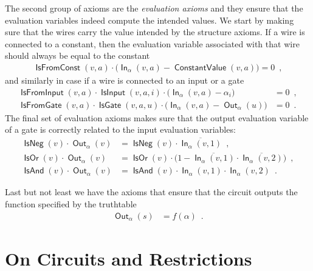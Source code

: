 \documentclass[10pt,a4paper]{article}
\theoremstyle{plain}
\theoremstyle{remark}
\theoremstyle{definition}
\newcommand{\eqcomma}{\enspace ,}
\newcommand{\eqperiod}{\enspace .}
\newcommand{\vars}[1]{\mathsf{#1}}
\DeclareMathOperator{\outwire}{\vars{Out}}
\DeclareMathOperator{\inwire}{\vars{In}}
\DeclareMathOperator{\isneg}{\vars{IsNeg}}
\DeclareMathOperator{\isand}{\vars{IsAnd}}
\DeclareMathOperator{\isor}{\vars{IsOr}}
\DeclareMathOperator{\isfromconst}{\vars{IsFromConst}}
\DeclareMathOperator{\isfromvar}{\vars{IsFromInput}}
\DeclareMathOperator{\isfromgate}{\vars{IsFromGate}}
\DeclareMathOperator{\constval}{\vars{ConstantValue}}
\DeclareMathOperator{\isvar}{\vars{IsInput}}
\DeclareMathOperator{\isgate}{\vars{IsGate}}
\begin{document}
The second group of axioms are the \emph{evaluation axioms} and they
ensure that the evaluation variables indeed compute the intended
values. We start by making sure that the wires carry the value
intended by the structure axioms. If a wire is connected to a
constant, then the evaluation variable associated with that wire
should always be equal to the constant
\begin{align}
  \label{eq:inwire-const}
  \isfromconst(v,a) \cdot
  \big( \inwire_{\alpha}(v,a) - \constval(v, a) \big) = 0 \eqcomma
\end{align}
and similarly in case if a wire is connected to an input or a gate
\begin{align}
  \label{eq:inwire-var}
  \isfromvar(v, a) \cdot \isvar(v, a, i) \cdot
  \big( \inwire_\alpha(v, a) - \alpha_i\big) &= 0
  \eqcomma\\
  \label{eq:inwire-gate}
  \isfromgate(v, a) \cdot \isgate(v, a, u) \cdot
  \big(\inwire_\alpha(v, a) - \outwire_\alpha(u)\big) &= 0 \eqperiod
\end{align}
The final set of evaluation axioms makes sure that the output
evaluation variable of a gate is correctly related to the input
evaluation variables:
\begin{align}
  \label{eq:ax-neg}
  \isneg(v) \cdot
  \outwire_{\alpha}(v)
  &=
    \isneg(v) \cdot
    \overline{\inwire_{\alpha}(v, 1)}\eqcomma\\
  \label{eq:ax-or}
  \isor(v) \cdot
  \outwire_{\alpha}(v)
  &=
    \isor(v)
    \cdot \big(
    1 -
    \overline{\inwire_{\alpha}(v, 1)} \cdot
    \overline{\inwire_{\alpha}(v, 2)}
    \big) \eqcomma\\
  \label{eq:ax-and}
  \isand(v) \cdot
  \outwire_{\alpha}(v)
  &=
    \isand(v) \cdot
    \inwire_{\alpha}(v, 1) \cdot
    \inwire_{\alpha}(v, 2) \eqperiod
\end{align}

Last but not least we have the axioms that ensure that the circuit
outputs the function specified by the truthtable
\begin{align}
  \label{eq:ax-correct}
  \outwire_{\alpha}(s) &= f(\alpha) \eqperiod
\end{align}

\section{On Circuits and Restrictions}
\label{sec:circ-rest}
\end{document}
